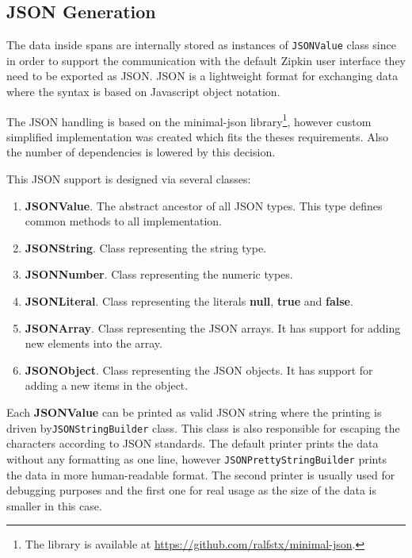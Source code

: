 \subsection{JSON Generation}
\label{json_gen}
The data inside spans are internally stored as instances of \texttt{JSONValue} class since in order to support the communication with the default Zipkin user interface they need to be exported as JSON. JSON is a lightweight format for exchanging data where the syntax is based on Javascript object notation.

The JSON handling is based on the minimal-json library\footnote{The library is available at \url{https://github.com/ralfstx/minimal-json}.}, however custom simplified implementation was created which fits the theses requirements. Also the number of dependencies is lowered by this decision. 

This JSON support is designed via several classes:
\begin{enumerate}
	\item \textbf{JSONValue}. The abstract ancestor of all JSON types. This type defines common methods to all implementation.
	\item \textbf{JSONString}. Class representing the string type.
	\item \textbf{JSONNumber}. Class representing the numeric types.
	\item \textbf{JSONLiteral}. Class representing the literals \textbf{null}, \textbf{true} and \textbf{false}.
	\item \textbf{JSONArray}. Class representing the JSON arrays. It has support for adding new elements into the array.
	\item \textbf{JSONObject}. Class representing the JSON objects. It has support for adding a new items in the object.
\end{enumerate}

Each \textbf{JSONValue} can be printed as valid JSON string where the printing is driven by\texttt{JSONStringBuilder} class. This class is also responsible for escaping the characters according to JSON standards. The default printer prints the data without any formatting as one line, however \texttt{JSONPrettyStringBuilder} prints the data in more human-readable format. The second printer is usually used for debugging purposes and the first one for real usage as the size of the data is smaller in this case.


